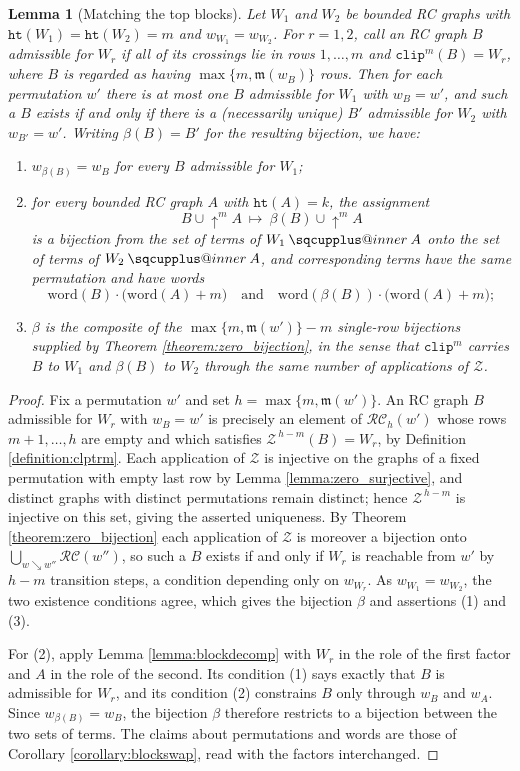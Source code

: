 \documentclass{amsart}
\makeatletter
\newcommand{\sqcupplus@inner}[2]{%
  \vcenter{\hbox{\ooalign{%
    \hfil$\m@th#1\sqcup$\hfil\cr
    \hfil\raisebox{0.15ex}{$\m@th#1\scriptscriptstyle+$}\hfil\cr
  }}}%
}
\newcommand{\sqcupplus}{\mathbin{\mathpalette\sqcupplus@inner\relax}}
\newtheorem{lemma}{Lemma}[subsection]
\theoremstyle{definition}
\theoremstyle{remark}
\numberwithin{equation}{subsection}
\newcommand{\shup}{{\uparrow}}
\newcommand{\downvar}[1]{\stackrel{#1}{\searrow}}
\newcommand{\wof}[1]{w_{#1}}
\newcommand{\zeromap}{\mathcal{Z}}
\newcommand{\hr}{\mathtt{ht}}
\newcommand{\clp}{\mathtt{clip}}
\newcommand{\RC}{\mathcal{RC}}
\newcommand{\maxd}{\mathfrak{m}}
\makeatother
\begin{document}
\begin{lemma}[Matching the top blocks]\label{lemma:topmatch}
Let $W_1$ and $W_2$ be bounded RC graphs with $\hr(W_1)=\hr(W_2)=m$ and $\wof{W_1}=\wof{W_2}$. For $r=1,2$, call an RC graph $B$ \emph{admissible for $W_r$} if all of its crossings lie in rows $1,\ldots,m$ and $\clp^{m}(B)=W_r$, where $B$ is regarded as having $\max\{m,\maxd(\wof B)\}$ rows. Then for each permutation $w'$ there is at most one $B$ admissible for $W_1$ with $\wof B=w'$, and such a $B$ exists if and only if there is a (necessarily unique) $B'$ admissible for $W_2$ with $\wof{B'}=w'$. Writing $\beta(B)=B'$ for the resulting bijection, we have:
\begin{enumerate}
\item $\wof{\beta(B)}=\wof B$ for every $B$ admissible for $W_1$;
\item for every bounded RC graph $A$ with $\hr(A)=k$, the assignment
$$B\cup\shup^{m}A\ \longmapsto\ \beta(B)\cup\shup^{m}A$$
is a bijection from the set of terms of $W_1\sqcupplus A$ onto the set of terms of $W_2\sqcupplus A$, and corresponding terms have the same permutation and have words
$$\mathrm{word}(B)\cdot\bigl(\mathrm{word}(A)+m\bigr)\quad\text{and}\quad\mathrm{word}(\beta(B))\cdot\bigl(\mathrm{word}(A)+m\bigr);$$
\item $\beta$ is the composite of the $\max\{m,\maxd(w')\}-m$ single-row bijections supplied by Theorem \ref{theorem:zero_bijection}, in the sense that $\clp^{m}$ carries $B$ to $W_1$ and $\beta(B)$ to $W_2$ through the same number of applications of $\zeromap$.
\end{enumerate}
\end{lemma}
\begin{proof}
Fix a permutation $w'$ and set $h=\max\{m,\maxd(w')\}$. An RC graph $B$ admissible for $W_r$ with $\wof B=w'$ is precisely an element of $\RC_h(w')$ whose rows $m+1,\ldots,h$ are empty and which satisfies $\zeromap^{\,h-m}(B)=W_r$, by Definition \ref{definition:clptrm}. Each application of $\zeromap$ is injective on the graphs of a fixed permutation with empty last row by Lemma \ref{lemma:zero_surjective}, and distinct graphs with distinct permutations remain distinct; hence $\zeromap^{\,h-m}$ is injective on this set, giving the asserted uniqueness. By Theorem \ref{theorem:zero_bijection} each application of $\zeromap$ is moreover a bijection onto $\bigcup_{w\downvar{}w''}\RC(w'')$, so such a $B$ exists if and only if $W_r$ is reachable from $w'$ by $h-m$ transition steps, a condition depending only on $\wof{W_r}$. As $\wof{W_1}=\wof{W_2}$, the two existence conditions agree, which gives the bijection $\beta$ and assertions (1) and (3).

For (2), apply Lemma \ref{lemma:blockdecomp} with $W_r$ in the role of the first factor and $A$ in the role of the second. Its condition (1) says exactly that $B$ is admissible for $W_r$, and its condition (2) constrains $B$ only through $\wof B$ and $\wof A$. Since $\wof{\beta(B)}=\wof B$, the bijection $\beta$ therefore restricts to a bijection between the two sets of terms. The claims about permutations and words are those of Corollary \ref{corollary:blockswap}, read with the factors interchanged.
\end{proof}
\end{document}
